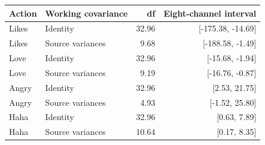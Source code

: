 \begin{tabular}{llrr}
\toprule
Action & Working covariance & df & Eight-channel interval \\
\midrule
Likes & Identity & 32.96 & [-175.38, -14.69] \\
Likes & Source variances & 9.68 & [-188.58, -1.49] \\
Love & Identity & 32.96 & [-15.68, -1.94] \\
Love & Source variances & 9.19 & [-16.76, -0.87] \\
Angry & Identity & 32.96 & [2.53, 21.75] \\
Angry & Source variances & 4.93 & [-1.52, 25.80] \\
Haha & Identity & 32.96 & [0.63, 7.89] \\
Haha & Source variances & 10.64 & [0.17, 8.35] \\
\bottomrule
\end{tabular}
